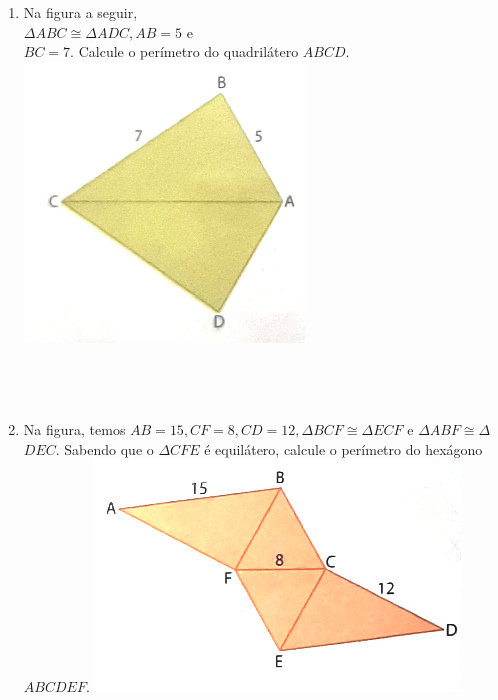 \documentclass[a4paper,14pt]{article}
\begin{document}
\begin{multicols}{2}
\begin{enumerate}
			\item Na figura a seguir, \\ $\Delta$$ABC \cong \Delta$$ADC, AB = 5$ e \\ $BC = 7$. Calcule o perímetro do quadrilátero $ABCD$.
			\includegraphics[width=1\linewidth]{6FMA110_imagens/imagem2} \\\\\\\\
			\item Na figura, temos $AB = 15, CF = 8, CD = 12, \Delta$$BCF \cong \Delta$$ECF$ e $\Delta$$ABF \cong \Delta$$DEC$. Sabendo que o $\Delta$$CFE$ é equilátero, calcule o perímetro do hexágono $ABCDEF$.
			\includegraphics[width=1\linewidth]{6FMA110_imagens/imagem3} \newpage
$$
\end{enumerate}
\end{multicols}
\end{document}
